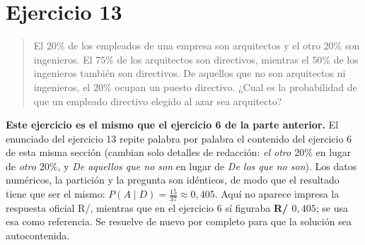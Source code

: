 \documentclass[11pt]{article}
\begin{document}
\newpage
\section*{Ejercicio 13}

\begin{quote}
El $20\%$ de los empleados de una empresa son arquitectos y el otro $20\%$ son ingenieros. El $75\%$ de los arquitectos son directivos, mientras el $50\%$ de los ingenieros también son directivos. De aquellos que no son arquitectos ni ingenieros, el $20\%$ ocupan un puesto directivo. ¿Cual es la probabilidad de que un empleado directivo elegido al azar sea arquitecto?
\end{quote}

\begin{nota}
\textbf{Este ejercicio es el mismo que el ejercicio 6 de la parte anterior.} El enunciado del ejercicio 13 repite palabra por palabra el contenido del ejercicio 6 de esta misma sección (cambian solo detalles de redacción: \emph{el otro $20\%$} en lugar de \emph{otro $20\%$}, y \emph{De aquellos que no son} en lugar de \emph{De los que no son}). Los datos numéricos, la partición y la pregunta son idénticos, de modo que el resultado tiene que ser el mismo: $P(A\mid D)=\tfrac{15}{37}\approx 0,405$. Aquí no aparece impresa la respuesta oficial R/, mientras que en el ejercicio 6 sí figuraba \textbf{R/ $0,405$}; se usa esa como referencia. Se resuelve de nuevo por completo para que la solución sea autocontenida.
\end{nota}
\end{document}
